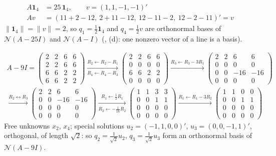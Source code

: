 \documentclass[12pt]{article}
\newcommand{\one}{\mathbf 1}
\theoremstyle{definition}
\newcommand{\boardtop}{\vspace*{-\abovedisplayskip}}
\begin{document}
\begin{board}[\(\lambda=25\), \(1\): \(\dim\mathcal N(A-25I)=\dim\mathcal N(A-I)=1\) (Theorem~\ref{h-thm-spectral}(b)); row
sums \(25\):]
\boardtop
\begin{align*}
A\one_4&=25\,\one_4,\qquad v=(1,1,-1,-1)'\\
Av&=(11+2-12,\ 2+11-12,\ 12-11-2,\ 12-2-11)'=v
\end{align*}
\(\lVert\one_4\rVert=\lVert v\rVert=2\), so \(q_1=\frac12\one_4\) and \(q_4=\frac12v\) are orthonormal bases of
\(\mathcal N(A-25I)\) and \(\mathcal N(A-I)\) (, (d): one nonzero vector of a line is a basis).
\end{board}
\begin{board}[\(\lambda=9\): reduce \(A-9I\); special solutions, a basis of \(\mathcal N(A-9I)\) (\lec{4}, \lit{Theorem~8}(c)):]
\[
\begin{gathered}
A-9I=\begin{pmatrix}2&2&6&6\\2&2&6&6\\6&6&2&2\\6&6&2&2\end{pmatrix}
\xrightarrow[R_4\leftarrow R_4-R_3]{R_2\leftarrow R_2-R_1}
\begin{pmatrix}2&2&6&6\\0&0&0&0\\6&6&2&2\\0&0&0&0\end{pmatrix}
\xrightarrow{R_3\leftarrow R_3-3R_1}
\begin{pmatrix}2&2&6&6\\0&0&0&0\\0&0&-16&-16\\0&0&0&0\end{pmatrix}
\\
\xrightarrow{R_2\leftrightarrow R_3}
\begin{pmatrix}2&2&6&6\\0&0&-16&-16\\0&0&0&0\\0&0&0&0\end{pmatrix}
\xrightarrow[R_2\leftarrow-\frac1{16}R_2]{R_1\leftarrow\frac12R_1}
\begin{pmatrix}1&1&3&3\\0&0&1&1\\0&0&0&0\\0&0&0&0\end{pmatrix}
\xrightarrow{R_1\leftarrow R_1-3R_2}
\begin{pmatrix}1&1&0&0\\0&0&1&1\\0&0&0&0\\0&0&0&0\end{pmatrix}
\end{gathered}
\]
Free unknowns \(x_2\), \(x_4\); special solutions \(u_2=(-1,1,0,0)'\), \(u_3=(0,0,-1,1)'\), orthogonal, of length
\(\sqrt2\): so \(q_2=\frac1{\sqrt2}u_2\), \(q_3=\frac1{\sqrt2}u_3\) form an orthonormal basis of \(\mathcal N(A-9I)\).
\end{board}
\end{document}

